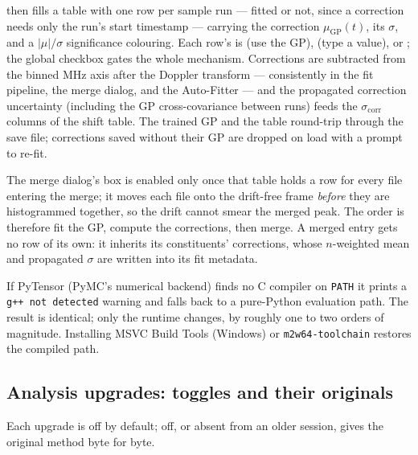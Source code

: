  then fills a table with one row
per sample run --- fitted or not, since a correction needs only the
run's start timestamp --- carrying the correction
$\mu_{\mathrm{GP}}(t)$, its
$\sigma$, and a $|\mu|/\sigma$ significance colouring. Each row's
 is  (use the GP),  (type a value),
or ; the global  checkbox
gates the whole mechanism. Corrections are subtracted from the
binned MHz axis after the Doppler transform --- consistently in the
fit pipeline, the merge dialog, and the Auto-Fitter --- and the
propagated correction uncertainty (including the GP cross-covariance
between runs) feeds the $\sigma_{\mathrm{corr}}$ columns of the
shift table. The trained GP and the table round-trip through the
save file; corrections saved without their GP are dropped on load
with a prompt to re-fit.

The merge dialog's  box is
enabled only once that table holds a row for every file entering the
merge; it moves each file onto the drift-free frame \emph{before}
they are histogrammed together, so the drift cannot smear the merged
peak. The order is therefore fit the GP, compute the corrections,
then merge. A merged entry gets no row of its own: it inherits its
constituents' corrections, whose $n$-weighted mean and propagated
$\sigma$ are written into its fit metadata.

If PyTensor (PyMC's numerical backend) finds no C compiler on
\texttt{PATH} it prints a \texttt{g++ not detected} warning and falls
back to a pure-Python evaluation path. The result is identical; only
the runtime changes, by roughly one to two orders of magnitude.
Installing MSVC Build Tools (Windows) or \texttt{m2w64-toolchain}
restores the compiled path.

\subsection{Analysis upgrades: toggles and their originals}

Each upgrade is off by default; off, or absent from an older session,
gives the original method byte for byte.

